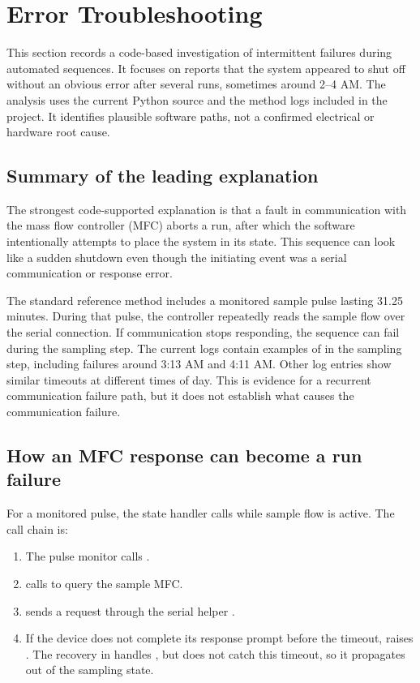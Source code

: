\section{Error Troubleshooting}
\label{Error Troubleshooting}

This section records a code-based investigation of intermittent failures during
automated sequences. It focuses on reports that the system appeared to shut
off without an obvious error after several runs, sometimes around 2--4 AM.
The analysis uses the current Python source and the method logs included in
the project. It identifies plausible software paths, not a confirmed
electrical or hardware root cause.

\subsection{Summary of the leading explanation}

The strongest code-supported explanation is that a fault in communication
with the mass flow controller (MFC) aborts a run, after which the software
intentionally attempts to place the system in its  state. This
sequence can look like a sudden shutdown even though the initiating event
was a serial communication or response error.

The standard reference method includes a monitored sample pulse lasting
31.25 minutes. During that pulse, the controller repeatedly reads the sample
flow over the serial connection. If communication stops responding, the
sequence can fail during the sampling step. The current logs contain examples
of  in the sampling step, including
failures around 3:13 AM and 4:11 AM. Other log entries show similar timeouts
at different times of day. This is evidence for a recurrent communication
failure path, but it does not establish what causes the communication failure.

\subsection{How an MFC response can become a run failure}

For a monitored pulse, the state handler calls 
while sample flow is active. The call chain is:
\begin{enumerate}
    \item The pulse monitor calls .
    \item {} calls  to query the
    sample MFC.
    \item {} sends a request through the serial helper
    .
    \item If the device does not complete its response prompt before the
    timeout,  raises . The recovery in
     handles , but does not catch
    this timeout, so it propagates out of the sampling state.
\end{enumerate}

